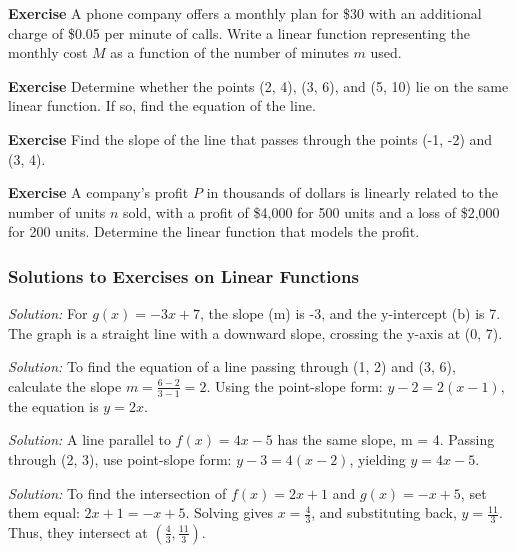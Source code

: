 \documentclass[a4paper,12pt]{book}
\newenvironment{exercise}[1][]
  {\par\medskip\noindent\textbf{Exercise #1} \rmfamily}
  {\medskip}
\newenvironment{solution}[1][]
{\par\noindent\textit{Solution:} \rmfamily}{\medskip}
\begin{document}
\begin{exercise}
A phone company offers a monthly plan for \$30 with an additional charge of \$0.05 per minute of calls. Write a linear function representing the monthly cost \( M \) as a function of the number of minutes \( m \) used.
\end{exercise}

\begin{exercise}
Determine whether the points (2, 4), (3, 6), and (5, 10) lie on the same linear function. If so, find the equation of the line.
\end{exercise}

\begin{exercise}
Find the slope of the line that passes through the points (-1, -2) and (3, 4).
\end{exercise}

\begin{exercise}
A company’s profit \( P \) in thousands of dollars is linearly related to the number of units \( n \) sold, with a profit of \$4,000 for 500 units and a loss of \$2,000 for 200 units. Determine the linear function that models the profit.
\end{exercise}

\subsubsection*{Solutions to Exercises on Linear Functions}

\begin{solution}[1]
For \( g(x) = -3x + 7 \), the slope (m) is -3, and the y-intercept (b) is 7. The graph is a straight line with a downward slope, crossing the y-axis at (0, 7).
\end{solution}

\begin{solution}[2]
To find the equation of a line passing through (1, 2) and (3, 6), calculate the slope \( m = \frac{6 - 2}{3 - 1} = 2 \). Using the point-slope form: \( y - 2 = 2(x - 1) \), the equation is \( y = 2x \).
\end{solution}

\begin{solution}[3]
A line parallel to \( f(x) = 4x - 5 \) has the same slope, m = 4. Passing through (2, 3), use point-slope form: \( y - 3 = 4(x - 2) \), yielding \( y = 4x - 5 \).
\end{solution}

\begin{solution}[4]
To find the intersection of \( f(x) = 2x + 1 \) and \( g(x) = -x + 5 \), set them equal: \( 2x + 1 = -x + 5 \). Solving gives \( x = \frac{4}{3} \), and substituting back, \( y = \frac{11}{3} \). Thus, they intersect at \( (\frac{4}{3}, \frac{11}{3}) \).
\end{solution}
\end{document}
